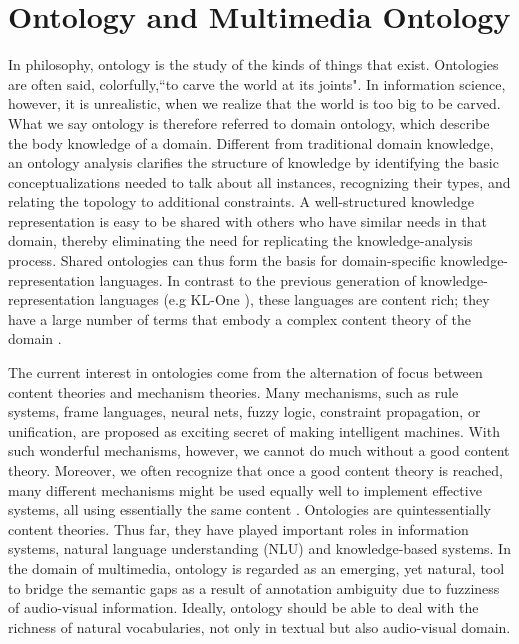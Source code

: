\section{Ontology and Multimedia Ontology}
In philosophy, ontology is the study of the kinds of things that
exist. Ontologies are often said, colorfully,``to carve the world at
its joints". In information science, however, it is unrealistic,
when we realize that the world is too big to be carved. What we say
ontology is therefore referred to domain ontology, which describe
the body knowledge of a domain. Different from traditional domain
knowledge, an ontology analysis clarifies the structure of knowledge
by identifying the basic conceptualizations needed to talk about all
instances, recognizing their types, and relating the topology to
additional constraints. A well-structured knowledge representation
is easy to be shared with others who have similar needs in that
domain, thereby eliminating the need for replicating the
knowledge-analysis process. Shared ontologies can thus form the
basis for domain-specific knowledge-representation languages. In
contrast to the previous generation of knowledge-representation
languages (e.g KL-One \cite{R.J.Brachman:CS:1985}), these languages
are content rich; they have a large number of terms that embody a
complex content theory of the domain
\cite{B.Chandrasekaran:IEEEIS:1999}.

The current interest in ontologies come from the alternation of
focus between content theories and mechanism theories. Many
mechanisms, such as rule systems, frame languages, neural nets,
fuzzy logic, constraint propagation, or unification, are proposed as
exciting secret of making intelligent machines. With such wonderful
mechanisms, however, we cannot do much without a good content
theory. Moreover, we often recognize that once a good content theory
is reached, many different mechanisms might be used equally well to
implement effective systems, all using essentially the same content
\cite{B.Chandrasekaran:IEEEE:1994}. Ontologies are quintessentially
content theories. Thus far, they have played important roles in
information systems, natural language understanding (NLU) and
knowledge-based systems. In the domain of multimedia, ontology is
regarded as an emerging, yet natural, tool to bridge the semantic
gaps as a result of annotation ambiguity due to fuzziness of
audio-visual information. Ideally, ontology should be able to deal
with the richness of natural vocabularies, not only in textual but
also audio-visual domain.

